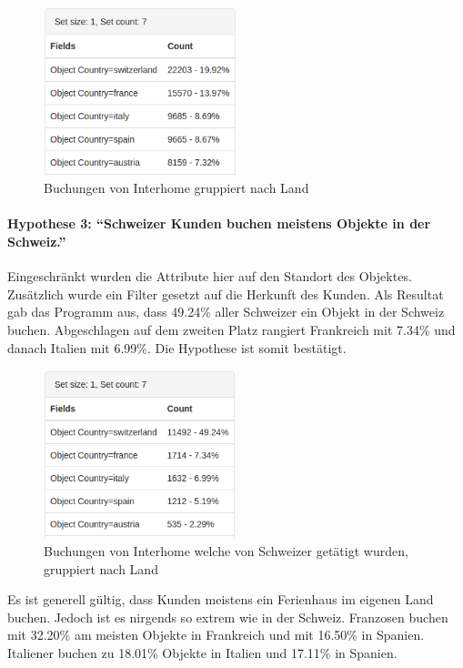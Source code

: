 \begin{figure}[H]
	\RawFloats
	\centering
	\includegraphics[width=0.5\textwidth]{images/hypothese2}
	\caption{Buchungen von Interhome gruppiert nach Land}
	\label{fig:testingfazit:testing:hypothesen:hypothese2}
\end{figure}

\paragraph{Hypothese 3: "`Schweizer Kunden buchen meistens Objekte in der Schweiz."'} Eingeschränkt wurden die Attribute hier auf den Standort des Objektes. Zusätzlich wurde ein Filter gesetzt auf die Herkunft des Kunden. Als Resultat gab das Programm aus, dass 49.24\% aller Schweizer ein Objekt in der Schweiz buchen. Abgeschlagen auf dem zweiten Platz rangiert Frankreich mit 7.34\% und danach Italien mit 6.99\%. Die Hypothese ist somit bestätigt.

\begin{figure}[H]
	\RawFloats
	\centering
	\includegraphics[width=0.5\textwidth]{images/hypothese3-1}
	\caption{Buchungen von Interhome welche von Schweizer getätigt wurden, gruppiert nach Land}
	\label{fig:testingfazit:testing:hypothesen:hypothese3:1}
\end{figure}

Es ist generell gültig, dass Kunden meistens ein Ferienhaus im eigenen Land buchen. Jedoch ist es nirgends so extrem wie in der Schweiz. Franzosen buchen mit 32.20\% am meisten Objekte in Frankreich und mit 16.50\% in Spanien. Italiener buchen zu 18.01\% Objekte in Italien und 17.11\% in Spanien.

